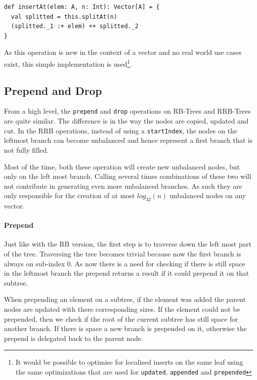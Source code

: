 \begin{lstlisting}[frame=single]
def insertAt(elem: A, n: Int): Vector[A] = {
  val splitted = this.splitAt(n)
  (splitted._1 :+ elem) ++ splitted._2
}
\end{lstlisting}

As this operation is new in the context of a vector and no real world use cases exist, this simple implementation is used\footnote{It would be possible to optimise for localised inserts on the same leaf using the same optimizations that are used for \texttt{updated}, \texttt{appended} and \texttt{prepended}}.

\subsection{Prepend and Drop}
From a high level, the \texttt{prepend} and \texttt{drop} operations on RB-Trees and RRB-Trees are quite similar. The difference is in the way the nodes are copied, updated and cut. In the RRB operations, instead of using a \texttt{startIndex}, the nodes on the leftmost branch can become unbalanced and hence represent a first branch that is not fully filled.

Most of the time, both these operation will create new unbalanced nodes, but only on the left most branch. Calling several times combinations of these two will not contribute in generating even more unbalanced branches. As such they are only responsible for the creation of at most $ log_{32}(n)$ unbalanced nodes on any vector.

\paragraph{Prepend}
Just like with the RB version, the first step is to traverse down the left most part of the tree. Traversing the tree becomes trivial because now the first branch is always on sub-index 0. As now there is a need for checking if there is still space in the leftmost branch the prepend returns a result if it could prepend it on that subtree.  

When prepending an element on a subtree, if the element was added the parent nodes are updated with there corresponding sizes. If the element could not be prepended, then we check if the root of the current subtree has still space for another branch. If there is space a new branch is prepended on it, otherwise the prepend is delegated back to the parent node.

